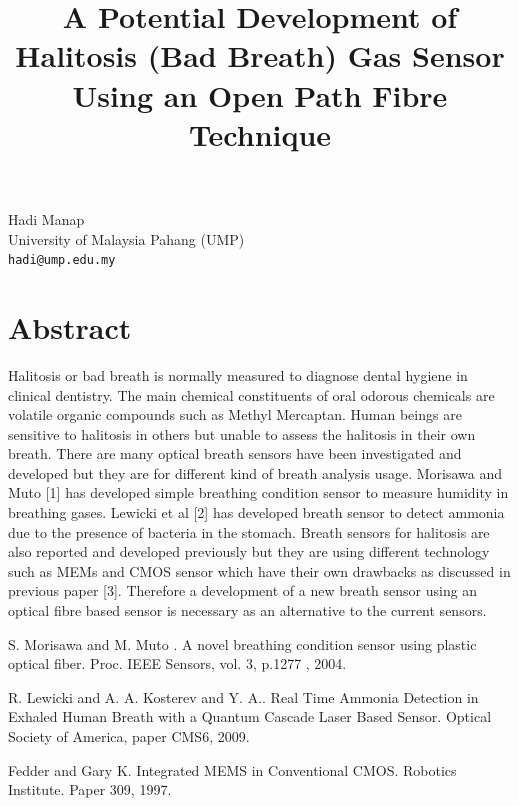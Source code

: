 \documentclass[article, A4, 11pt]{llncs}%
\begin{document}
\title{A Potential Development of Halitosis (Bad Breath) Gas Sensor Using an Open Path Fibre Technique}
 \author{} \institute{}
\maketitle
\begin{center}
{\large Hadi Manap}\\
University of Malaysia Pahang (UMP)\\
{\tt hadi@ump.edu.my}
\end{center}

\section*{Abstract}
Halitosis or bad breath is normally measured to diagnose dental hygiene in clinical dentistry. The main chemical constituents of oral odorous chemicals are volatile organic compounds such as Methyl Mercaptan. Human beings are sensitive to halitosis in others but unable to assess the halitosis in their own breath. There are many optical breath sensors have been investigated and developed but they are for different kind of breath analysis usage. Morisawa and Muto [1] has developed simple breathing condition sensor to measure humidity in breathing gases. Lewicki et al [2] has developed breath sensor to detect ammonia due to the presence of bacteria in the stomach. Breath sensors for halitosis are also reported and developed previously but they are using different technology such as MEMs and CMOS sensor which have their own drawbacks as discussed in previous paper [3]. Therefore a development of a new breath sensor using an optical fibre based sensor is necessary as an alternative to the current sensors.


\begin{thebibliography}{10}
{\sc S. Morisawa and M. Muto }. {A novel breathing condition sensor using plastic optical fiber}. Proc. IEEE Sensors, vol. 3, p.1277 , 2004.

{\sc R. Lewicki and A. A. Kosterev and Y. A.}. {Real Time Ammonia Detection in Exhaled Human Breath with a Quantum Cascade Laser Based Sensor}. Optical Society of America, paper CMS6, 2009.

{\sc Fedder  and Gary K}. {Integrated MEMS in Conventional CMOS}. Robotics Institute. Paper 309, 1997.
\end{thebibliography} %
\end{document}
